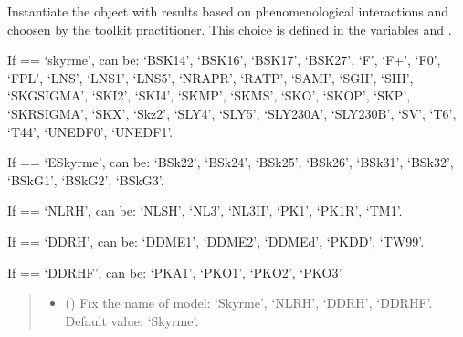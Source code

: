 \documentclass[letterpaper,10pt,english]{sphinxmanual}
\begin{document}
\begin{fulllineitems}
\label{\detokenize{source/api/setup_matter_pheno_esym:nucleardatapy.matter.setup_pheno_esym.setupPhenoEsym}}
\pysigstartsignatures
{}
\pysigstopsignatures
\sphinxAtStartPar
Instantiate the object with results based on phenomenological    interactions and choosen by the toolkit practitioner.     This choice is defined in the variables  and .

\sphinxAtStartPar
If  == ‘skyrme’,  can be: ‘BSK14’,     ‘BSK16’, ‘BSK17’, ‘BSK27’, ‘F\sphinxhyphen{}’, ‘F+’, ‘F0’, ‘FPL’, ‘LNS’, ‘LNS1’, ‘LNS5’,     ‘NRAPR’, ‘RATP’, ‘SAMI’, ‘SGII’, ‘SIII’, ‘SKGSIGMA’, ‘SKI2’, ‘SKI4’, ‘SKMP’,     ‘SKMS’, ‘SKO’, ‘SKOP’, ‘SKP’, ‘SKRSIGMA’, ‘SKX’, ‘Skz2’, ‘SLY4’, ‘SLY5’,     ‘SLY230A’, ‘SLY230B’, ‘SV’, ‘T6’, ‘T44’, ‘UNEDF0’, ‘UNEDF1’.

\sphinxAtStartPar
If  == ‘ESkyrme’,  can be: ‘BSk22’, ‘BSk24’, ‘BSk25’,     ‘BSk26’, ‘BSk31’, ‘BSk32’, ‘BSkG1’, ‘BSkG2’, ‘BSkG3’.

\sphinxAtStartPar
If  == ‘NLRH’,  can be: ‘NL\sphinxhyphen{}SH’, ‘NL3’, ‘NL3II’, ‘PK1’, ‘PK1R’, ‘TM1’.

\sphinxAtStartPar
If  == ‘DDRH’,  can be: ‘DDME1’, ‘DDME2’, ‘DDMEd’, ‘PKDD’, ‘TW99’.

\sphinxAtStartPar
If  == ‘DDRHF’,  can be: ‘PKA1’, ‘PKO1’, ‘PKO2’, ‘PKO3’.
\begin{quote}\begin{description}
\begin{itemize}
\item {} 
\sphinxAtStartPar
{} (\sphinxstyleliteralemphasis{\sphinxupquote{, }}) \textendash{} Fix the name of model: ‘Skyrme’, ‘NLRH’,     ‘DDRH’, ‘DDRHF’. Default value: ‘Skyrme’.


\end{itemize}
\end{description}
\end{quote}
\end{fulllineitems}
\end{document}
